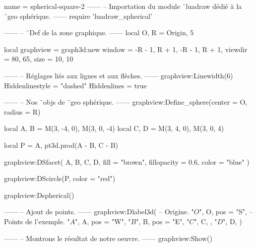 \documentclass{standalone}
\begin{document}
\begin{luadraw}{name = spherical-square-2}
------
-- Importation du module ¨luadraw dédié à la ¨geo sphérique.
------
require 'luadraw_spherical'

------
-- ¨Def de la zone graphique.
------
local O, R = Origin, 5

local graphview = graph3d:new{
  window  = {-R - 1, R + 1, -R - 1, R + 1},
  viewdir = {80, 65},
  size    = {10, 10}
}

------
-- Réglages liés aux lignes et aux flèches.
------
graphview:Linewidth(6)
Hiddenlinestyle = "dashed"
Hiddenlines     = true

------
-- Nos ¨objs de ¨geo sphérique.
------
graphview:Define_sphere({center = O, radius = R})

local A, B = M(3, -4, 0), M(3, 0, -4)
local C, D = M(3, 4, 0), M(3, 0, 4)

local P = {A, pt3d.prod(A - B, C - B)}

graphview:DSfacet(
  {A, B, C, D},
  {fill = "brown", fillopacity = 0.6, color = "blue"}
)

graphview:DScircle(P, {color = "red"})

graphview:Dspherical()

------
-- Ajout de points.
------
graphview:Dlabel3d(
-- Origine.
  "$O$", O, {pos = "S"},
-- Points de l'exemple.
  "$A$", A, {pos = "W"},
  "$B$", B, {pos = "E"},
  "$C$", C, {},
  "$D$", D, {}
)

------
-- Montrons le résultat de notre oeuvre.
------
graphview:Show()
\end{luadraw}
\end{document}
